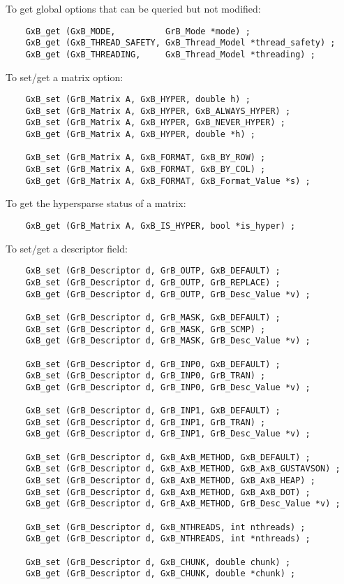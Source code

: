 \documentclass[12pt]{article}
\begin{document}
\noindent
To get global options that can be queried but not modified:

    {\footnotesize
    \begin{verbatim}
    GxB_get (GxB_MODE,          GrB_Mode *mode) ;
    GxB_get (GxB_THREAD_SAFETY, GxB_Thread_Model *thread_safety) ;
    GxB_get (GxB_THREADING,     GxB_Thread_Model *threading) ; \end{verbatim} }

\noindent
To set/get a matrix option:

    {\footnotesize
    \begin{verbatim}
    GxB_set (GrB_Matrix A, GxB_HYPER, double h) ;
    GxB_set (GrB_Matrix A, GxB_HYPER, GxB_ALWAYS_HYPER) ;
    GxB_set (GrB_Matrix A, GxB_HYPER, GxB_NEVER_HYPER) ;
    GxB_get (GrB_Matrix A, GxB_HYPER, double *h) ;

    GxB_set (GrB_Matrix A, GxB_FORMAT, GxB_BY_ROW) ;
    GxB_set (GrB_Matrix A, GxB_FORMAT, GxB_BY_COL) ;
    GxB_get (GrB_Matrix A, GxB_FORMAT, GxB_Format_Value *s) ; \end{verbatim} }

\noindent
To get the hypersparse status of a matrix:

    {\footnotesize
    \begin{verbatim}
    GxB_get (GrB_Matrix A, GxB_IS_HYPER, bool *is_hyper) ; \end{verbatim} }

\newpage
\noindent
To set/get a descriptor field:

    {\footnotesize
    \begin{verbatim}
    GxB_set (GrB_Descriptor d, GrB_OUTP, GxB_DEFAULT) ;
    GxB_set (GrB_Descriptor d, GrB_OUTP, GrB_REPLACE) ;
    GxB_get (GrB_Descriptor d, GrB_OUTP, GrB_Desc_Value *v) ;

    GxB_set (GrB_Descriptor d, GrB_MASK, GxB_DEFAULT) ;
    GxB_set (GrB_Descriptor d, GrB_MASK, GrB_SCMP) ;
    GxB_get (GrB_Descriptor d, GrB_MASK, GrB_Desc_Value *v) ;

    GxB_set (GrB_Descriptor d, GrB_INP0, GxB_DEFAULT) ;
    GxB_set (GrB_Descriptor d, GrB_INP0, GrB_TRAN) ;
    GxB_get (GrB_Descriptor d, GrB_INP0, GrB_Desc_Value *v) ;

    GxB_set (GrB_Descriptor d, GrB_INP1, GxB_DEFAULT) ;
    GxB_set (GrB_Descriptor d, GrB_INP1, GrB_TRAN) ;
    GxB_get (GrB_Descriptor d, GrB_INP1, GrB_Desc_Value *v) ;

    GxB_set (GrB_Descriptor d, GxB_AxB_METHOD, GxB_DEFAULT) ;
    GxB_set (GrB_Descriptor d, GxB_AxB_METHOD, GxB_AxB_GUSTAVSON) ;
    GxB_set (GrB_Descriptor d, GxB_AxB_METHOD, GxB_AxB_HEAP) ;
    GxB_set (GrB_Descriptor d, GxB_AxB_METHOD, GxB_AxB_DOT) ;
    GxB_get (GrB_Descriptor d, GrB_AxB_METHOD, GrB_Desc_Value *v) ;

    GxB_set (GrB_Descriptor d, GxB_NTHREADS, int nthreads) ;
    GxB_get (GrB_Descriptor d, GxB_NTHREADS, int *nthreads) ;

    GxB_set (GrB_Descriptor d, GxB_CHUNK, double chunk) ;
    GxB_get (GrB_Descriptor d, GxB_CHUNK, double *chunk) ; \end{verbatim} }
\end{document}
